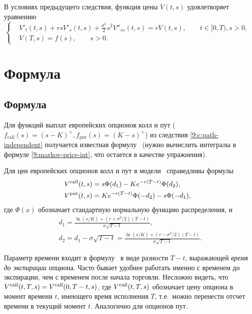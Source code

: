 \begin{corollary}[уравнение \bs]
В условиях предыдущего следствия, функция цены $V(t,s)$ удовлетворяет уравнению
\begin{equation}
\label{9:bs-pde}
\left\{
\begin{aligned}
&V'_t(t,s) + rsV'_s(t,s) + \frac{\sigma^2}{2} s^2 V''_{ss}(t,s) = rV(t,s),
  \qquad t\in[0,T), s>0,\\
&V(T,s) = f(s), \qquad s>0.
\end{aligned}
\right.
\end{equation}

\medskip
\end{corollary}


\section{Формула \bs}
\label{9:s:bs}
\subsection{Формула}
Для функций выплат европейских опционов колл и пут ($f_{\text{call}}(s) = (s-K)^+, f_{\text{put}}(s) = (K-s)^+$) из следствия \ref{9:c:path-independent} получается известная формулу \bs\ (нужно вычислить интегралы в формуле \eqref{9:markov-price-int}, что остается в качестве упражнения).

\begin{corollary}[формула \bs]
Для цен европейских опционов колл и пут в модели \bs\ справедливы формулы
\begin{equation}
\label{bs1:bs-formula}
\begin{aligned}
&V^{\text{\normalfont call}}(t,s) = s \Phi(d_1) - K e^{-r(T-t)} \Phi(d_2), \\
&V^{\text{\normalfont put}}(t,s) = K e^{-r(T-t)} \Phi(-d_2) - s \Phi(-d_1),
\end{aligned}
\end{equation}
где $\Phi(x)$ обозначает стандартную нормальную функцию распределения, и
\begin{align*}
&d_1 = \frac{\ln(s/K) + (r+\sigma^2/2)(T-t)}{\sigma\sqrt{T-t}}, \\
&d_2 = d_1 - \sigma\sqrt{T-t} = \frac{\ln(s/K) + (r-\sigma^2/2)(T-t)}{\sigma\sqrt{T-t}}.
\end{align*}
\end{corollary}

\begin{remark}
Параметр времени входит в формулу \bs\ в виде разности $T-t$, выражающей \emph{время до экспирации} опциона.
Часто бывает удобнее работать именно с временем до экспирации, чем с временем после начала торговли. 
Несложно видеть, что $V^{\text{\normalfont call}}(t,T,s) = V^{\text{\normalfont call}}(0,T-t,s)$, где $V^{\text{\normalfont call}}(t,T,s)$ обозначает цену опциона в момент времени $t$, имеющего время исполнения $T$, т.е.\ можно перенести отсчет времени в текущий момент $t$.
Аналогично для опционов пут.
\end{remark}

